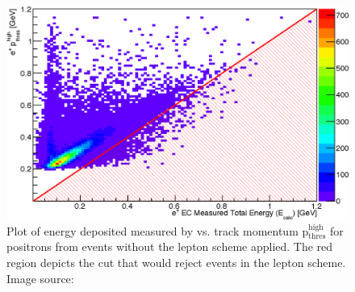 \begin{figure}\begin{center}
\includegraphics[width=0.9\columnwidth]{figures/lepton/Pip_EChighcut.eps}
\caption[ Deposited Energy Comparison to Track Momentum for e$^+$ from \π[0] Events]{\label{fig:islep.pipECcut}Plot of energy deposited measured by  vs. track momentum p$\mathrm{_{thres}^{high}}$ for positrons from \π[0] events without the  lepton   scheme applied. The red region depicts the cut that would reject events in the  lepton   scheme. Image source:~\cite{clas.thesis.kunkel}}
\end{center}\end{figure}
%


\FloatBarrier
